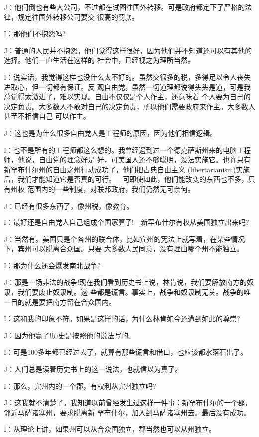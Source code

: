 ﻿\documentclass[11pt]{article}
\begin{document}
J：他们倒也有些大公司，不过都在试图往国外转移。可是政府都定下了严格的法律，规定往国外转移公司要交
很高的罚款。

I：那他们不抱怨吗?

J：普通的人民并不抱怨。他们觉得这样很好，因为他们并不知道还可以有其他的选择。他们一直生活在这样的
社会中，已经视之为理所当然。

I：说实话，我觉得这样也没什么太不好的。虽然交很多的税，多得足以令人丧失进取心，但一切都有保证。反
观自由党，虽然一切道理都说得头头是道，可是我总觉得太激进了，难以实现。自由不仅仅是个人作主，还意味着
个人要为自己的决定负责。大多数人不敢对自己的决定负责，所以他们需要政府来作主。大多数人甚至不相信自己
可以作主。

J：这也是为什么很多自由党人是工程师的原因，因为他们相信逻辑。

I：也不是所有的工程师都这么想的。我曾经遇到过一个德克萨斯州来的电脑工程师，他说，自由党的理念好是
好，可美国人还不够聪明，没法实施它。也许只有新罕布什尔州的自由之州行动成功了，他们把古典自由主义
(libertarianism)实施后，我们才能知道它是否真的可行。---可即使如此，他们能改变的东西也不多，只有州权
范围内的一些制度，对联邦政府，我们仍然无可奈何。

J：已经有很多东西了，像州税，像教育。

I：最好还是自由党人自己组成个国家算了!---新罕布什尔有权从美国独立出来吗?

J：当然有。美国只是个各州的联合体，比如宾州的宪法上就写着，在某些情况下，宾州可以脱离合众国。只要
大多数人民同意，没有理由哪个州不能独立。

I：那为什么还会爆发南北战争?

J：那是一场非法的战争!现在我们看到历史书上说，林肯说，我们要解放南方的奴隶，我们要废止奴隶制。这
些都是谎言。事实上，战争和奴隶制无关。战争的唯一目的就是要把南方留在合众国内。

I：这和我的印象不符。如果是这样的话，为什么林肯如今还遭到如此的尊崇?

J：因为他赢了!历史是按照他的说法写的。

I：可是100多年都已经过去了，就算有那些谎言和借口，也应该都水落石出了。

J：人们总是读着历史书上的这一说法，也就信以为真了。

I：那么，宾州内的一个郡，有权利从宾州独立吗?

J：这我就不清楚了。我知道以前曾经发生过这样一件事：新罕布什尔的一个郡，邻近马萨诸塞州，要求脱离新
罕布什尔，加入到马萨诸塞州去。最后没有成功。

I：从理论上讲，如果州可以从合众国独立，郡当然也可以从州独立。
\end{document}
